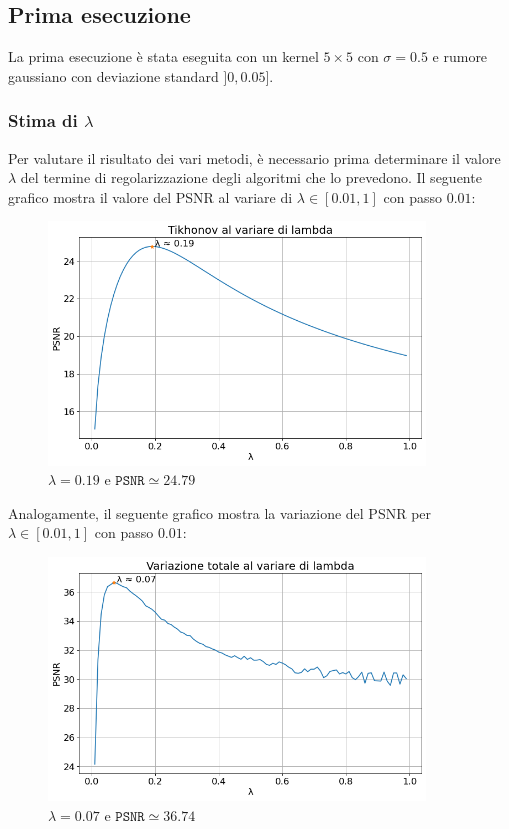 \documentclass[11pt]{article}
\begin{document}
\subsection{Prima esecuzione}
La prima esecuzione è stata eseguita con un kernel $5 \times 5$ con $\sigma=0.5$ e rumore gaussiano con deviazione standard $]0, 0.05]$.

\subsubsection{Stima di $\lambda$}
Per valutare il risultato dei vari metodi, è necessario prima determinare il valore $\lambda$ del termine di regolarizzazione degli algoritmi che lo prevedono.
Il seguente grafico mostra il valore del PSNR al variare di $\lambda \in [0.01, 1]$ con passo $0.01$:
\begin{figure}[H]
    \centering
    \includegraphics[width=10cm]{esecuzione/1/tikhonov_lambda.png}
    \caption{$\lambda=0.19$ e $\texttt{PSNR} \simeq 24.79$}
    \label{fig:tikhonov_lambda1}
\end{figure}
Analogamente, il seguente grafico mostra la variazione del PSNR per $\lambda \in [0.01, 1]$ con passo $0.01$:
\begin{figure}[H]
    \centering
    \includegraphics[width=10cm]{esecuzione/1/tv_lambda.png}
    \caption{$\lambda=0.07$ e $\texttt{PSNR} \simeq 36.74$}
    \label{fig:tv_lambda1}
\end{figure}
\end{document}
